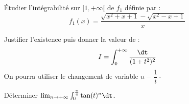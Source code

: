 \documentclass[twoside,a4paper,french,1pt]{VcCours}
\begin{document}
    \begin{Exercice} Étudier l'intégrabilité sur $[1, + \infty[$ de $f_1$ définie par :
    $$ f_1(x)=\frac{\sqrt{x^2+x+1}-\sqrt{x^2-x+1}}{x}$$
  \end{Exercice} 
    
    \begin{Exercice} Justifier l'existence puis donner la valeur de :
      \[
      I = \int_{0}^{ + \infty} \frac{\dt}{(1 + t^{2})^{2}}
      \]
    On pourra utiliser le changement de variable $u = \dfrac{1}{t} \cdot$
  \end{Exercice} 
    
    \begin{Exercice} Déterminer $ \lim_{n \rightarrow + \infty} \int_{0}^{\frac{\pi}{4}} \tan(t)^n \dt$.
    \end{Exercice} 
    
    
  
\end{document}

